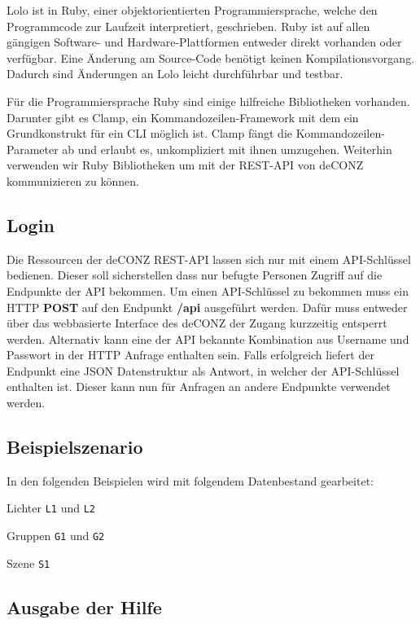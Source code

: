 \documentclass[a4paper,12pt]{article}
\begin{document}
Lolo ist in Ruby, einer objektorientierten Programmiersprache, welche den Programmcode zur Laufzeit interpretiert, geschrieben. Ruby ist auf allen gängigen Software- und Hardware-Plattformen entweder direkt vorhanden oder verfügbar. Eine Änderung am Source-Code benötigt keinen Kompilationsvorgang. Dadurch sind Änderungen an Lolo leicht durchführbar und testbar.

Für die Programmiersprache Ruby sind einige hilfreiche Bibliotheken vorhanden. Darunter gibt es Clamp, ein Kommandozeilen-Framework mit dem ein Grundkonstrukt für ein CLI möglich ist. Clamp fängt die Kommandozeilen-Parameter ab und erlaubt es, unkompliziert mit ihnen umzugehen. Weiterhin verwenden wir Ruby Bibliotheken um mit der REST-API von deCONZ kommunizieren zu können.

\subsection{Login}

Die Ressourcen der deCONZ REST-API lassen sich nur mit einem API-Schlüssel bedienen. Dieser soll sicherstellen dass nur befugte Personen Zugriff auf die Endpunkte der API bekommen. Um einen API-Schlüssel zu bekommen muss ein HTTP \textbf{POST} auf den Endpunkt \textbf{/api} ausgeführt werden. Dafür muss entweder über das webbasierte Interface des deCONZ der Zugang kurzzeitig entsperrt werden. Alternativ kann eine der API bekannte Kombination aus Username und Passwort in der HTTP Anfrage enthalten sein. Falls erfolgreich liefert der Endpunkt eine JSON Datenstruktur als Antwort, in welcher der API-Schlüssel enthalten ist. Dieser kann nun für Anfragen an andere Endpunkte verwendet werden.

\subsection{Beispielszenario}

In den folgenden Beispielen wird mit folgendem Datenbestand gearbeitet:

\noindent
Lichter \texttt{L1} und \texttt{L2}

\noindent
Gruppen \texttt{G1} und \texttt{G2}

\noindent
Szene \texttt{S1}

\subsection{Ausgabe der Hilfe}
\end{document}
